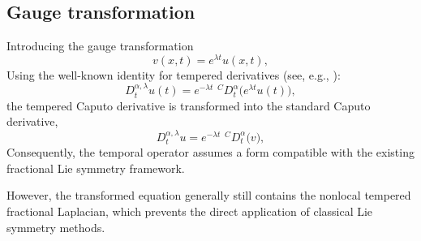 \documentclass{article}
\begin{document}
\subsection{Gauge transformation}
Introducing the gauge transformation
\begin{equation*}
v(x,t)=e^{\lambda t}u(x,t),
\end{equation*}
Using the well-known identity for tempered derivatives (see, e.g., \cite{ortigueira2021,Sabzikar2015}):
\begin{equation}\label{eq:identity}
D_t^{\alpha,\lambda}u(t)
= e^{-\lambda t}\,\,{}^{C}D_t^{\alpha}\big(e^{\lambda t}u(t)\big),
\end{equation}
the tempered Caputo derivative is transformed into the standard Caputo derivative,
\begin{equation*}
D_t^{\alpha,\lambda}u
= e^{-\lambda t}\,\,{}^{C}D_t^{\alpha}\big(v\big),
\end{equation*}
Consequently, the temporal operator assumes a form compatible with the existing fractional Lie symmetry framework.
\par 
However, the transformed equation generally still contains the nonlocal tempered fractional Laplacian, which prevents the direct application of classical Lie symmetry methods.
\end{document}
